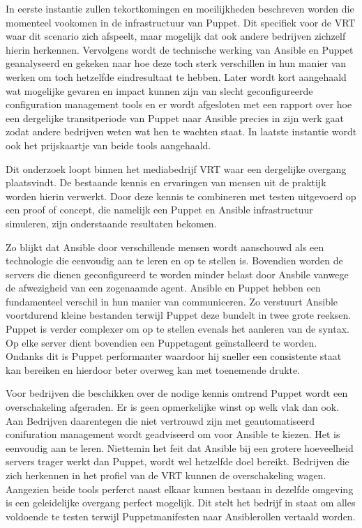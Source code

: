 In eerste instantie zullen tekortkomingen en moeilijkheden beschreven worden die momenteel vookomen in de infrastructuur van Puppet. Dit specifiek voor de VRT waar dit scenario zich afspeelt, maar mogelijk dat ook andere bedrijven zichzelf hierin herkennen. Vervolgens wordt de technische werking van Ansible en Puppet geanalyseerd en gekeken naar hoe deze toch sterk verschillen in hun manier van werken om toch hetzelfde eindresultaat te hebben. Later wordt kort aangehaald wat mogelijke gevaren en impact kunnen zijn van slecht geconfigureerde configuration management tools en er wordt afgesloten met een rapport over hoe een dergelijke transitperiode van Puppet naar Ansible precies in zijn werk gaat zodat andere bedrijven weten wat hen te wachten staat. In laatste instantie wordt ook het prijskaartje van beide tools aangehaald.

Dit onderzoek loopt binnen het mediabedrijf VRT waar een dergelijke overgang plaatsvindt. De bestaande kennis en ervaringen van mensen uit de praktijk worden hierin verwerkt. Door deze kennis te combineren met testen uitgevoerd op een proof of concept, die namelijk een Puppet en Ansible infrastructuur simuleren, zijn onderstaande resultaten bekomen.

Zo blijkt dat Ansible door verschillende mensen wordt aanschouwd als een technologie die eenvoudig aan te leren en op te stellen is. Bovendien worden de servers die dienen geconfigureerd te worden minder belast door Ansbile vanwege de afwezigheid van een zogenaamde agent. Ansible en Puppet hebben een fundamenteel verschil in hun manier van communiceren. Zo verstuurt Ansible voortdurend kleine bestanden terwijl Puppet deze bundelt in twee grote reeksen. Puppet is verder complexer om op te stellen evenals het aanleren van de syntax. Op elke server dient bovendien een Puppetagent ge\"installeerd te worden. Ondanks dit is Puppet performanter waardoor hij sneller een consistente staat kan bereiken en hierdoor beter overweg kan met toenemende drukte.

Voor bedrijven die beschikken over de nodige kennis omtrend Puppet wordt een overschakeling afgeraden. Er is geen opmerkelijke winst op welk vlak dan ook. Aan Bedrijven daarentegen die niet vertrouwd zijn met geautomatiseerd conifuration management  wordt geadviseerd om voor Ansible te kiezen. Het is eenvoudig aan te leren. Niettemin het feit dat Ansible bij een grotere hoeveelheid servers trager werkt dan Puppet, wordt wel hetzelfde doel bereikt. Bedrijven die zich herkennen in het profiel van de VRT kunnen de overschakeling wagen. Aangezien beide tools perferct naast elkaar kunnen bestaan in dezelfde omgeving is een geleidelijke overgang perfect mogelijk. Dit stelt het bedrijf in staat om alles voldoende te testen terwijl Puppetmanifesten naar Ansiblerollen vertaald worden.

